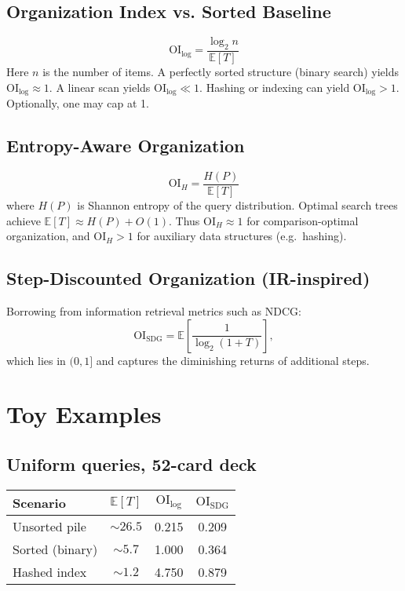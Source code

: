 \documentclass[11pt]{article}
\begin{document}
\subsection{Organization Index vs. Sorted Baseline}
\[
\mathrm{OI}_{\log} = \frac{\log_2 n}{\mathbb{E}[T]}
\]
Here $n$ is the number of items. A perfectly sorted structure (binary search)
yields $\mathrm{OI}_{\log} \approx 1$. A linear scan yields
$\mathrm{OI}_{\log} \ll 1$. Hashing or indexing can yield $\mathrm{OI}_{\log} >
1$. Optionally, one may cap at 1.

\subsection{Entropy-Aware Organization}
\[
\mathrm{OI}_H = \frac{H(P)}{\mathbb{E}[T]}
\]
where $H(P)$ is Shannon entropy of the query distribution. Optimal search trees
achieve $\mathbb{E}[T] \approx H(P)+O(1)$. Thus $\mathrm{OI}_H \approx 1$ for
comparison-optimal organization, and $\mathrm{OI}_H > 1$ for auxiliary data
structures (e.g.\ hashing).

\subsection{Step-Discounted Organization (IR-inspired)}
Borrowing from information retrieval metrics such as NDCG:
\[
\mathrm{OI}_{\text{SDG}} = \mathbb{E}\!\left[\frac{1}{\log_2(1+T)}\right],
\]
which lies in $(0,1]$ and captures the diminishing returns of additional steps.

\section{Toy Examples}
\subsection{Uniform queries, 52-card deck}
\begin{center}
\begin{tabular}{lccc}
\toprule
Scenario & $\mathbb{E}[T]$ & $\mathrm{OI}_{\log}$ & $\mathrm{OI}_{\text{SDG}}$ \\
\midrule
Unsorted pile   & $\sim26.5$ & 0.215 & 0.209 \\
Sorted (binary) & $\sim5.7$  & 1.000 & 0.364 \\
Hashed index    & $\sim1.2$  & 4.750 & 0.879 \\
\bottomrule
\end{tabular}
\end{center}
\end{document}

